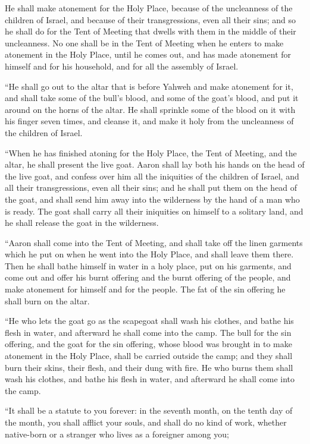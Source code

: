 {He shall make atonement for the Holy Place, because of the uncleanness of the children of Israel, and because of their transgressions, even all their sins; and so he shall do for the Tent of Meeting that dwells with them in the middle of their uncleanness.
No one shall be in the Tent of Meeting when he enters to make atonement in the Holy Place, until he comes out, and has made atonement for himself and for his household, and for all the assembly of Israel.
\par }{\PP {}“He shall go out to the altar that is before Yahweh and make atonement for it, and shall take some of the bull’s blood, and some of the goat’s blood, and put it around on the horns of the altar.
He shall sprinkle some of the blood on it with his finger seven times, and cleanse it, and make it holy from the uncleanness of the children of Israel.
\par }{\PP {}“When he has finished atoning for the Holy Place, the Tent of Meeting, and the altar, he shall present the live goat.
Aaron shall lay both his hands on the head of the live goat, and confess over him all the iniquities of the children of Israel, and all their transgressions, even all their sins; and he shall put them on the head of the goat, and shall send him away into the wilderness by the hand of a man who is ready.
The goat shall carry all their iniquities on himself to a solitary land, and he shall release the goat in the wilderness.
\par }{\PP {}“Aaron shall come into the Tent of Meeting, and shall take off the linen garments which he put on when he went into the Holy Place, and shall leave them there.
Then he shall bathe himself in water in a holy place, put on his garments, and come out and offer his burnt offering and the burnt offering of the people, and make atonement for himself and for the people.
The fat of the sin offering he shall burn on the altar.
\par }{\PP {}“He who lets the goat go as the scapegoat shall wash his clothes, and bathe his flesh in water, and afterward he shall come into the camp.
The bull for the sin offering, and the goat for the sin offering, whose blood was brought in to make atonement in the Holy Place, shall be carried outside the camp; and they shall burn their skins, their flesh, and their dung with fire.
He who burns them shall wash his clothes, and bathe his flesh in water, and afterward he shall come into the camp.
\par }{\PP {}“It shall be a statute to you forever: in the seventh month, on the tenth day of the month, you shall afflict your souls, and shall do no kind of work, whether native-born or a stranger who lives as a foreigner among you;
}
